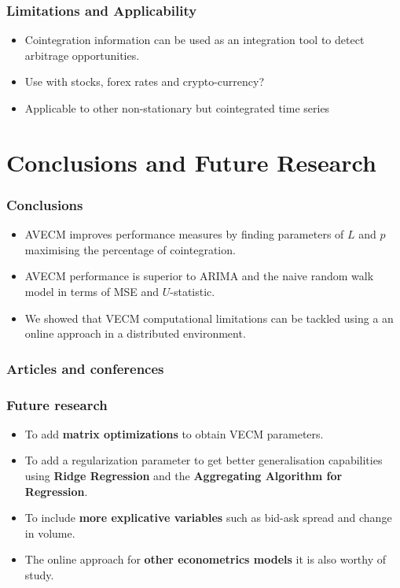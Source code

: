 \documentclass{beamer}
\begin{document}
\begin{frame}
\frametitle{Limitations and Applicability}
\begin{itemize}
\item Cointegration information can be used as an integration tool to detect arbitrage opportunities.
\item Use with stocks, forex rates and crypto-currency?
\item Applicable to other non-stationary but cointegrated time series
\end{itemize}
\end{frame}

\section{Conclusions and Future Research}

\begin{frame}
\frametitle{Conclusions}
\begin{itemize}
\item AVECM improves performance measures by finding parameters of $L$ and $p$ maximising the percentage of cointegration.
\item AVECM performance is superior to ARIMA and the naive random walk model in terms of MSE and $U$-statistic. 
\item We showed that VECM computational limitations can be tackled using a an online approach in a distributed environment.
\end{itemize}
\end{frame}


\begin{frame}
\frametitle{Articles and conferences}
\nocite{arce+salinas2012,icpram15,Arce2017}


\end{frame}


\begin{frame}
\frametitle{Future research}
\begin{itemize}
\item To add {\bf matrix optimizations} to obtain VECM parameters.
\item To add a regularization parameter to get better generalisation capabilities using {\bf Ridge Regression} and the {\bf Aggregating Algorithm for Regression}.
\item To include {\bf more explicative variables} such as bid-ask spread and change in volume.
\item The online approach for {\bf other econometrics models} it is also worthy of  study.%
\end{itemize}
\end{frame}
\end{document}
